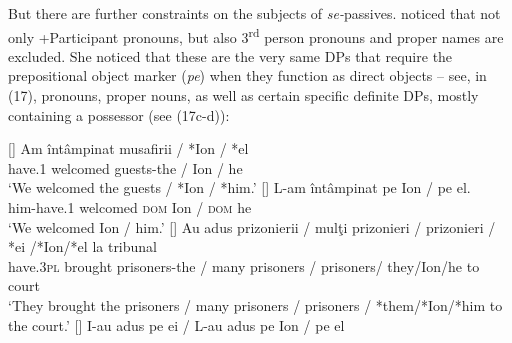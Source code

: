 \documentclass[output=paper]{langsci/langscibook}
\begin{document}
But there are further constraints on the subjects of \textit{se-}passives. \citet{Cornilescu1998} noticed that not only +Participant pronouns, but also 3\textsuperscript{rd} person pronouns and proper names are excluded. She noticed that these are the very same DPs that require the prepositional object marker (\textit{pe}) when they function as direct objects – see, in (17), pronouns, proper nouns, as well as certain specific definite DPs, mostly containing a possessor (see (17c-d)):

\ea%
    \label{ex:giurgea:17}
    \begin{xlista}[c{'}{'}.]
    []{
    \gll Am     întâmpinat musafirii / *Ion / *el\\
         have.\textsc{1} welcomed guests-the / Ion / he   \\
    \glt ‘We welcomed  the guests / *Ion / *him.’}
    []{
    \gll L-am          întâmpinat pe   Ion  / pe    el. \\
                him-have.\textsc{1} welcomed \textsc{dom} Ion / \textsc{dom} he\\
    \glt        ‘We welcomed  Ion / him.’}
    []{
    \gll Au          adus     prizonierii    / mulţi prizonieri  / prizonieri / *ei /*Ion/*el la tribunal\\
         have.\textsc{3pl} brought prisoners-the / many prisoners / prisoners/ they/Ion/he    to court\\
    \glt ‘They brought the prisoners / many prisoners / prisoners / *them/*Ion/*him to the court.’}
    []{
    \gll I-au                 adus      pe    ei    /   L-au               adus      pe    Ion /   pe    el\\
}
\end{xlista}
\end{document}
